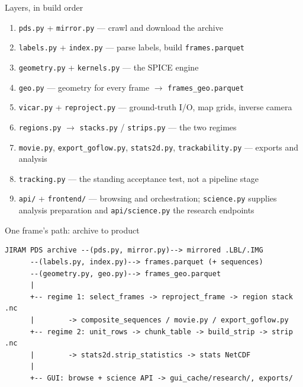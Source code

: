 \documentclass[aspectratio=169,11pt]{beamer}
\newcommand{\currevsec}{}
\newcommand{\revsec}[1]{\gdef\currevsec{#1}}
\begin{document}
\begin{frame}{Layers, in build order}
  \revsec{3}
  \small
  \begin{enumerate}
    \item \texttt{pds.py} + \texttt{mirror.py} --- crawl and download the archive
    \item \texttt{labels.py} + \texttt{index.py} --- parse labels, build \texttt{frames.parquet}
    \item \texttt{geometry.py} + \texttt{kernels.py} --- the SPICE engine
    \item \texttt{geo.py} --- geometry for every frame $\to$ \texttt{frames\_geo.parquet}
    \item \texttt{vicar.py} + \texttt{reproject.py} --- ground-truth I/O, map grids, inverse camera
    \item \texttt{regions.py} $\to$ \texttt{stacks.py} / \texttt{strips.py} --- the two regimes
    \item \texttt{movie.py}, \texttt{export\_goflow.py}, \texttt{stats2d.py}, \texttt{trackability.py} --- exports and analysis
    \item \texttt{tracking.py} --- the standing acceptance test, not a pipeline stage
    \item \texttt{api/} + \texttt{frontend/} --- browsing and orchestration; \texttt{science.py} supplies analysis preparation and \texttt{api/science.py} the research endpoints
  \end{enumerate}
\end{frame}

\begin{frame}[fragile]{One frame's path: archive to product}
  \revsec{3.2}
  \begin{center}
\begin{lstlisting}[basicstyle=\ttfamily\tiny,frame=none]
JIRAM PDS archive --(pds.py, mirror.py)--> mirrored .LBL/.IMG
      --(labels.py, index.py)--> frames.parquet (+ sequences)
      --(geometry.py, geo.py)--> frames_geo.parquet
      |
      +-- regime 1: select_frames -> reproject_frame -> region stack .nc
      |        -> composite_sequences / movie.py / export_goflow.py
      +-- regime 2: unit_rows -> chunk_table -> build_strip -> strip .nc
      |        -> stats2d.strip_statistics -> stats NetCDF
      |
      +-- GUI: browse + science API -> gui_cache/research/, exports/
\end{lstlisting}
  \end{center}
\end{frame}
\end{document}
